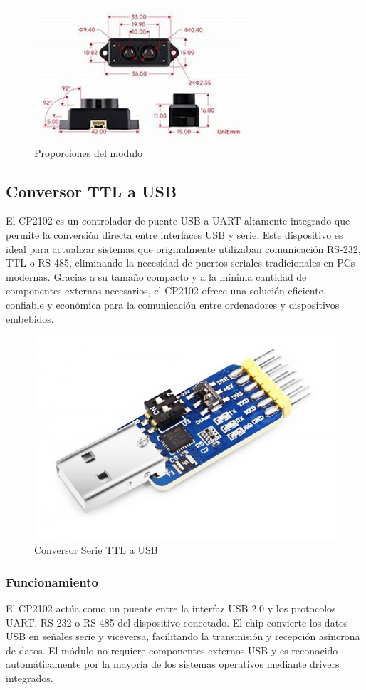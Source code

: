 \documentclass[12pt,a4paper]{article}
\begin{document}
\begin{figure}[H]
    \centering
    \includegraphics[width=0.8\linewidth]{Carpeta tecnica/Imagen3.png}
    \caption{Proporciones del modulo}
\end{figure}


\subsection{Conversor TTL a USB}

El CP2102 es un controlador de puente USB a UART altamente integrado que permite la conversión directa entre interfaces USB y serie. Este dispositivo es ideal para actualizar sistemas que originalmente utilizaban comunicación RS-232, TTL o RS-485, eliminando la necesidad de puertos seriales tradicionales en PCs modernas.  
Gracias a su tamaño compacto y a la mínima cantidad de componentes externos necesarios, el CP2102 ofrece una solución eficiente, confiable y económica para la comunicación entre ordenadores y dispositivos embebidos.

\begin{figure}[H]
\centering
\includegraphics[width=0.6\linewidth]{Carpeta tecnica/Uartransf.png}
\caption{Conversor Serie TTL a USB}
\end{figure}


\subsubsection{Funcionamiento}
El CP2102 actúa como un puente entre la interfaz USB 2.0 y los protocolos UART, RS-232 o RS-485 del dispositivo conectado.  
El chip convierte los datos USB en señales serie y viceversa, facilitando la transmisión y recepción asíncrona de datos.  
El módulo no requiere componentes externos USB y es reconocido automáticamente por la mayoría de los sistemas operativos mediante drivers integrados.
\end{document}

